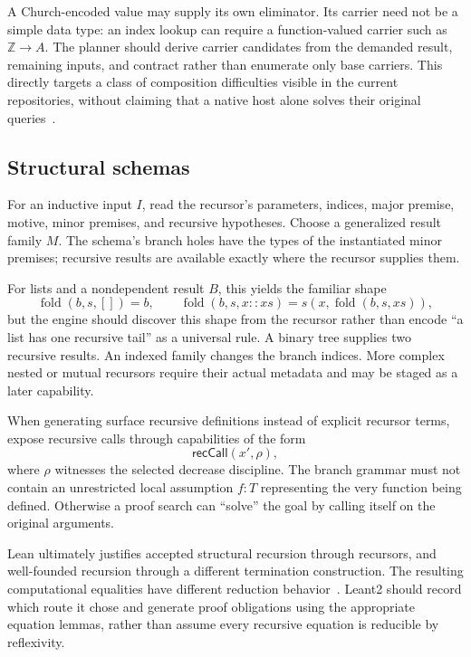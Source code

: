 A Church-encoded value may supply its own eliminator. Its carrier need not be a
simple data type: an index lookup can require a function-valued carrier such as
$\mathbb Z\to A$. The planner should derive carrier candidates from the demanded
result, remaining inputs, and contract rather than enumerate only base carriers.
This directly targets a class of composition difficulties visible in the
current repositories, without claiming that a native host alone solves their
original queries~\cite{indexing-diagnostic}.

\subsection{Structural schemas}

For an inductive input $I$, read the recursor's parameters, indices, major
premise, motive, minor premises, and recursive hypotheses. Choose a generalized
result family $M$. The schema's branch holes have the types of the instantiated
minor premises; recursive results are available exactly where the recursor
supplies them.

For lists and a nondependent result $B$, this yields the familiar shape
\[
 \operatorname{fold}(b,s,[])=b,\qquad
 \operatorname{fold}(b,s,x::xs)=s(x,\operatorname{fold}(b,s,xs)),
\]
but the engine should discover this shape from the recursor rather than encode
``a list has one recursive tail'' as a universal rule. A binary tree supplies
two recursive results. An indexed family changes the branch indices. More
complex nested or mutual recursors require their actual metadata and may be
staged as a later capability.

When generating surface recursive definitions instead of explicit recursor
terms, expose recursive calls through capabilities of the form
\[
 \mathsf{recCall}(x',\rho),
\]
where $\rho$ witnesses the selected decrease discipline. The branch grammar
must not contain an unrestricted local assumption $f:T$ representing the very
function being defined. Otherwise a proof search can ``solve'' the goal by
calling itself on the original arguments.

Lean ultimately justifies accepted structural recursion through recursors, and
well-founded recursion through a different termination construction. The
resulting computational equalities have different reduction behavior~\cite{lean-recursion}.
Leant2 should record which route it chose and generate proof obligations using
the appropriate equation lemmas, rather than assume every recursive equation
is reducible by reflexivity.

